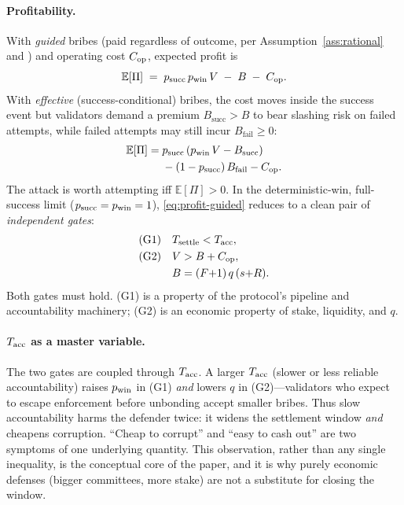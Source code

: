 \paragraph{Profitability.}
With \emph{guided} bribes (paid regardless of outcome, per Assumption~\ref{ass:rational} and
\cite{karakostas2024bribing}) and operating cost $C_{\mathrm{op}}$, expected profit is
\begin{equation}
\mathbb{E}[\Pi] \;=\; p_{\mathrm{succ}}\,p_{\mathrm{win}}\,V \;-\; B \;-\; C_{\mathrm{op}}.
\label{eq:profit-guided}
\end{equation}
With \emph{effective} (success-conditional) bribes, the cost moves inside the success event but
validators demand a premium $B_{\mathrm{succ}}>B$ to bear slashing risk on failed attempts, while
failed attempts may still incur $B_{\mathrm{fail}}\ge 0$:
\begin{equation}
\begin{aligned}
\mathbb{E}[\Pi] ={}& p_{\mathrm{succ}}\,(p_{\mathrm{win}}\,V - B_{\mathrm{succ}})\\
&{} - (1-p_{\mathrm{succ}})\,B_{\mathrm{fail}} - C_{\mathrm{op}}.
\end{aligned}
\label{eq:profit-effective}
\end{equation}
The attack is worth attempting iff $\mathbb{E}[\Pi]>0$. In the deterministic-win, full-success limit
($p_{\mathrm{succ}}=p_{\mathrm{win}}=1$), \eqref{eq:profit-guided} reduces to a clean pair of \emph{independent gates}:
\begin{align}
\mathrm{(G1)}\quad & T_{\mathrm{settle}} < T_{\mathrm{acc}}, \label{eq:g1}\\
\mathrm{(G2)}\quad & V > B + C_{\mathrm{op}}, \label{eq:g2}\\
& B=(F{+}1)\,q\,(s{+}R). \nonumber
\end{align}
Both gates must hold. (G1) is a property of the protocol's pipeline and accountability machinery;
(G2) is an economic property of stake, liquidity, and $q$.

\paragraph{$T_{\mathrm{acc}}$ as a master variable.}
The two gates are coupled through $T_{\mathrm{acc}}$. A larger $T_{\mathrm{acc}}$ (slower or less reliable accountability)
raises $p_{\mathrm{win}}$ in (G1) \emph{and} lowers $q$ in (G2)---validators who expect to escape enforcement
before unbonding accept smaller bribes. Thus slow accountability harms the defender twice: it widens
the settlement window \emph{and} cheapens corruption. ``Cheap to corrupt'' and ``easy to cash out''
are two symptoms of one underlying quantity. This observation, rather than any single inequality, is
the conceptual core of the paper, and it is why purely economic defenses (bigger committees, more
stake) are not a substitute for closing the window.

